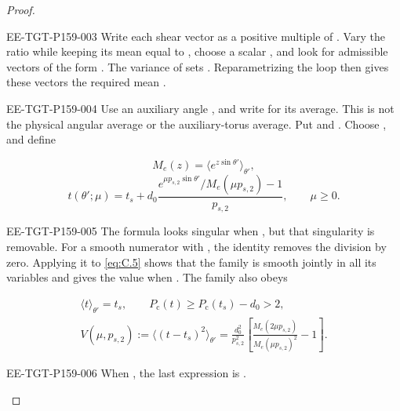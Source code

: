 \begin{proof}
\begin{EESegment}{EE-TGT-P159-003}
Write each shear vector as a positive multiple of . Vary the ratio  while keeping its
mean equal to , choose a scalar , and look for admissible vectors of the form
. The
variance of  sets . Reparametrizing the loop then gives these
vectors the required mean .
\end{EESegment}

\begin{EESegment}{EE-TGT-P159-004}
Use an auxiliary angle , and write
 for its average. This is not the physical angular average or the auxiliary-torus average. Put
 and
. Choose
, and define
\end{EESegment}
\begin{equation}
 M_e(z)=\bigl\langle e^{z\sin\theta'}\bigr\rangle_{\theta'},
\tag{C.4}\label{eq:C.4}
\end{equation}
\begin{equation}
 t(\theta';\mu)=t_s+d_0
 \frac{e^{\mu p_{s,2}\sin\theta'}/M_e(\mu p_{s,2})-1}{p_{s,2}},
 \qquad \mu\geq0.
\tag{C.5}\label{eq:C.5}
\end{equation}
\begin{EESegment}{EE-TGT-P159-005}
The formula looks singular when , but that singularity is removable. For a smooth numerator
 with
, the identity
 removes the division by zero. Applying it to \eqref{eq:C.5} shows that the family is smooth jointly in
all its variables and gives the value  when
. The family also obeys
\end{EESegment}
\begin{gather*}
 \langle t\rangle_{\theta'}=t_s,
 \qquad P_{\mathrm c}(t)\geq P_{\mathrm c}(t_s)-d_0>2,\\
 V(\mu,p_{s,2}):=\bigl\langle(t-t_s)^2\bigr\rangle_{\theta'}
 =\frac{d_0^2}{p_{s,2}^2}
 \left[\frac{M_e(2\mu p_{s,2})}{M_e(\mu p_{s,2})^2}-1\right].
\end{gather*}
\begin{EESegment}{EE-TGT-P159-006}
When , the last expression is .
\end{EESegment}


\end{proof}
